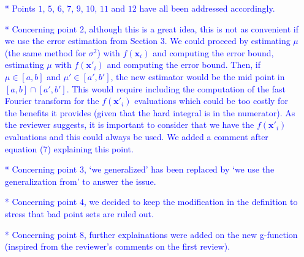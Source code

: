 \documentclass[10pt,a4paper]{article}
\newcommand{\vect}[1]{\boldsymbol{\mathbf{#1}}}
\newcommand{\vx}{\vect{x}}
\begin{document}
\textcolor{blue}{
\begin{itemize}
\item[*]Points $1$, $5$, $6$, $7$, $9$, $10$, $11$ and $12$ have all been addressed accordingly.
\item[*]Concerning point $2$, although this is a great idea, this is not as convenient if we use the error estimation from Section 3. We could proceed by estimating $\mu$ (the same method for $\sigma^2$) with $f(\vx_i)$ and computing the error bound, estimating $\mu$ with $f(\vx'_i)$ and computing the error bound. Then, if $\mu\in[a,b]$ and $\mu'\in[a',b']$, the new estimator would be the mid point in $[a,b]\cap[a',b']$. This would require including the computation of the fast Fourier transform for the $f(\vx'_i)$ evaluations which could be too costly for the benefits it provides (given that the hard integral is in the numerator). As the reviewer suggests, it is important to consider that we have the $f(\vx'_i)$ evaluations and this could always be used. We added a comment after equation (7) explaining this point.
\item[*]Concerning point $3$, `we generalized' has been replaced by `we use the generalization from' to answer the issue.
\item[*]Concerning point $4$, we decided to keep the modification in the definition to stress that bad point sets are ruled out.
\item[*]Concerning point $8$, further explainations were added on the new g-function (inspired from the reviewer's comments on the first review).
\end{itemize}}
\end{document}

